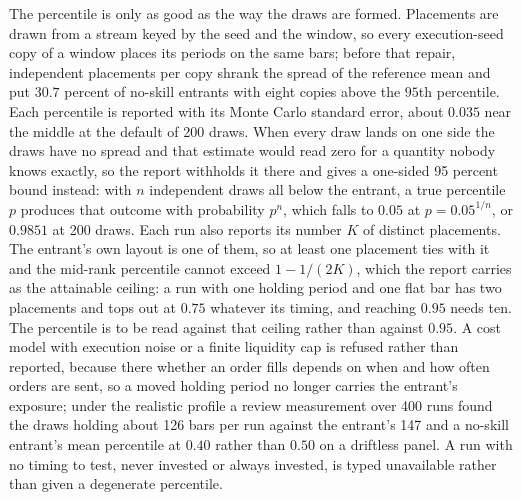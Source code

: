 The percentile is only as good as the way the draws are formed. Placements are drawn from a stream keyed by the seed and the window, so every execution-seed copy of a window places its periods on the same bars; before that repair, independent placements per copy shrank the spread of the reference mean and put $30.7$ percent of no-skill entrants with eight copies above the $95$th percentile. Each percentile is reported with its Monte Carlo standard error, about $0.035$ near the middle at the default of 200 draws. When every draw lands on one side the draws have no spread and that estimate would read zero for a quantity nobody knows exactly, so the report withholds it there and gives a one-sided 95 percent bound instead: with $n$ independent draws all below the entrant, a true percentile $p$ produces that outcome with probability $p^{n}$, which falls to $0.05$ at $p = 0.05^{1/n}$, or $0.9851$ at 200 draws. Each run also reports its number $K$ of distinct placements. The entrant's own layout is one of them, so at least one placement ties with it and the mid-rank percentile cannot exceed $1 - 1/(2K)$, which the report carries as the attainable ceiling: a run with one holding period and one flat bar has two placements and tops out at $0.75$ whatever its timing, and reaching $0.95$ needs ten. The percentile is to be read against that ceiling rather than against $0.95$. A cost model with execution noise or a finite liquidity cap is refused rather than reported, because there whether an order fills depends on when and how often orders are sent, so a moved holding period no longer carries the entrant's exposure; under the realistic profile a review measurement over 400 runs found the draws holding about 126 bars per run against the entrant's 147 and a no-skill entrant's mean percentile at $0.40$ rather than $0.50$ on a driftless panel. A run with no timing to test, never invested or always invested, is typed unavailable rather than given a degenerate percentile.

